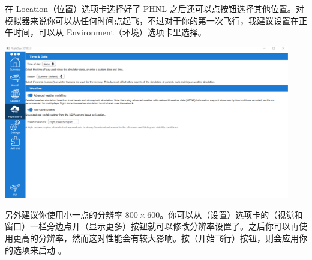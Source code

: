 \ifchinese
在 Location（位置）选项卡选择好了 PHNL 之后还可以点按钮选择其他位置。对模拟器来说你可以从任何时间点起飞，不过对于你的第一次飞行，我建议设置在正午时间，可以从 Environment（环境）选项卡里选择。
\fi

{}
\medskip

\centerline{
  \includegraphics[clip,width=12.5cm]{img/basic_tutorial/launcher-3}
}
\medskip
\ifchinese
另外建议你使用小一点的分辨率 $800\times600$。你可以从（设置）选项卡的（视觉和窗口）一栏旁边点开（显示更多）按钮就可以修改分辨率设置了。之后你可以再使用更高的分辨率，然而这对性能会有较大影响。按（开始飞行）按钮，则会应用你的选项来启动 \FlightGear{}。
\fi

\medskip

